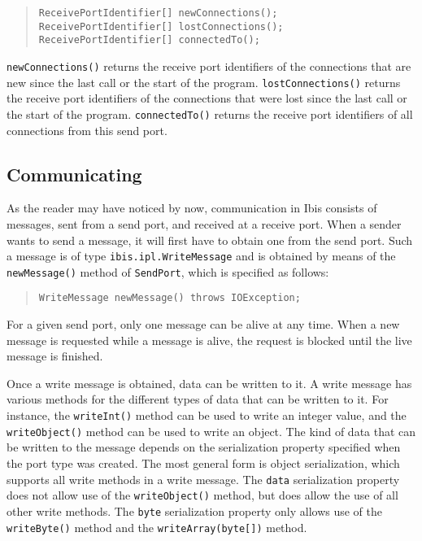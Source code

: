 \documentclass[10pt]{article}
\newcommand{\mysubsection}[1]{\subsection{#1}\label{#1}}
\begin{document}
\begin{quote}
\begin{verbatim}
ReceivePortIdentifier[] newConnections();
ReceivePortIdentifier[] lostConnections();
ReceivePortIdentifier[] connectedTo();
\end{verbatim}
\end{quote}
\noindent
\texttt{newConnections()} returns the receive port identifiers of the connections
that are new since the last call or the start of the program.
\texttt{lostConnections()} returns the receive port identifiers of the connections
that were lost since the last call or the start of the program.
\texttt{connectedTo()} returns the receive port identifiers of all connections
from this send port.

\mysubsection{Communicating}

As the reader may have noticed by now, communication in Ibis
consists of messages, sent from a send port, and received at a
receive port. When a sender wants to send a message, it will first
have to obtain one from the send port. Such a message is of
type \texttt{ibis.ipl.WriteMessage} and is obtained by means of
the \texttt{newMessage()} method of \texttt{SendPort}, which is specified
as follows:

\begin{quote}
\begin{verbatim}
WriteMessage newMessage() throws IOException;
\end{verbatim}
\end{quote}

\noindent
For a given send port, only one message can be alive at any time.
When a new message is requested while a message is alive, the request
is blocked until the live message is finished.

Once a write message is obtained, data can be written to it.
A write message has various methods for the different types of
data that can be written to it. For instance, the
\texttt{writeInt()} method can be used to write an integer value,
and the \texttt{writeObject()} method can be used to write an object.
The kind of data that can be written to the message depends on the
serialization property specified when the port type was created.
The most general form is object serialization, which supports 
all write methods in a write message.
The \texttt{data} serialization property does not allow use of the
\texttt{writeObject()} method, but does allow the use of all other write
methods. The \texttt{byte} serialization property only allows use
of the \texttt{writeByte()} method and the \texttt{writeArray(byte[])}
method.
\end{document}
